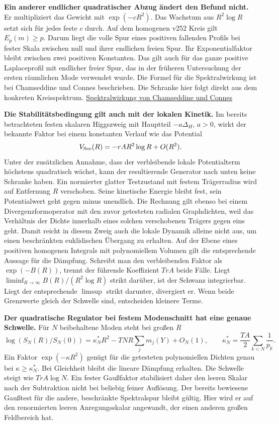 \documentclass[11pt,a4paper]{article}
\begin{document}
\textbf{Ein anderer endlicher quadratischer Abzug ändert den Befund nicht.}
Er multipliziert das Gewicht mit \(\exp(-cR^2)\). Das Wachstum aus \(R^2\log R\) setzt sich für jedes feste \(c\) durch. Auf dem homogenen v252 Kreis gilt \(E_p(m)\ge p\). Darum liegt die volle Spur eines positiven fallenden Profils bei fester Skala zwischen null und ihrer endlichen freien Spur. Ihr Exponentialfaktor bleibt zwischen zwei positiven Konstanten. Das gilt auch für das ganze positive Laplaceprofil mit endlicher freier Spur, das in der früheren Untersuchung der ersten räumlichen Mode verwendet wurde. Die Formel für die Spektralwirkung ist bei Chamseddine und Connes beschrieben. Die Schranke hier folgt direkt aus dem konkreten Kreisspektrum. \href{https://arxiv.org/abs/hep-th/9606001}{Spektralwirkung von Chamseddine und Connes}

\textbf{Die Stabilitätsbedingung gilt auch mit der lokalen Kinetik.}
Im bereits betrachteten festen skalaren Higgszweig mit Hauptteil \(-a\Delta_H\), \(a>0\), wirkt der bekannte Faktor bei einem konstanten Verlauf wie das Potential
\[
 V_{\rm See}(R)=-r A R^2\log R+O(R^2).
\]
Unter der zusätzlichen Annahme, dass der verbleibende lokale Potentialterm höchstens quadratisch wächst, kann der resultierende Generator nach unten keine Schranke haben. Ein normierter glatter Testzustand mit festem Trägerradius wird auf Entfernung \(R\) verschoben. Seine kinetische Energie bleibt fest, sein Potentialwert geht gegen minus unendlich. Die Rechnung gilt ebenso bei einem Divergenzformoperator mit den zuvor getesteten radialen Graphdichten, weil das Verhältnis der Dichte innerhalb eines solchen verschobenen Trägers gegen eins geht. Damit reicht in diesem Zweig auch die lokale Dynamik alleine nicht aus, um einen beschränkten euklidischen Übergang zu erhalten. Auf der Ebene eines positiven homogenen Integrals mit polynomiellem Volumen gilt die entsprechende Aussage für die Dämpfung. Schreibt man den verbleibenden Faktor als \(\exp(-B(R))\), trennt der führende Koeffizient \(T r A\) beide Fälle. Liegt \(\liminf_{R\to\infty} B(R)/(R^2\log R)\) strikt darüber, ist der Schwanz integrierbar. Liegt der entsprechende \(\limsup\) strikt darunter, divergiert er. Wenn beide Grenzwerte gleich der Schwelle sind, entscheiden kleinere Terme.

\textbf{Der quadratische Regulator bei festem Modenschnitt hat eine genaue Schwelle.}
Für \(N\) beibehaltene Moden steht bei großen \(R\)
\[
 \log(S_N(R)/S_N(0))
 = \kappa_N^* R^2 - T N R\sum_j m_j(Y)+O_N(1),\qquad
 \kappa_N^*=\frac{T A}{2}\sum_{k<N}\frac1{p_k}.
\]
Ein Faktor \(\exp(-\kappa R^2)\) genügt für die getesteten polynomiellen Dichten genau bei \(\kappa\ge\kappa_N^*\). Bei Gleichheit bleibt die lineare Dämpfung erhalten. Die Schwelle steigt wie \(T r A\log N\). Ein fester Gaußfaktor stabilisiert daher den leeren Skalar nach der Subtraktion nicht bei beliebig feiner Auflösung. Der bereits bewiesene Gaußtest für die andere, beschränkte Spektralspur bleibt gültig. Hier wird er auf den renormierten leeren Anregungsskalar angewandt, der einen anderen großen Feldbereich hat.
\end{document}
